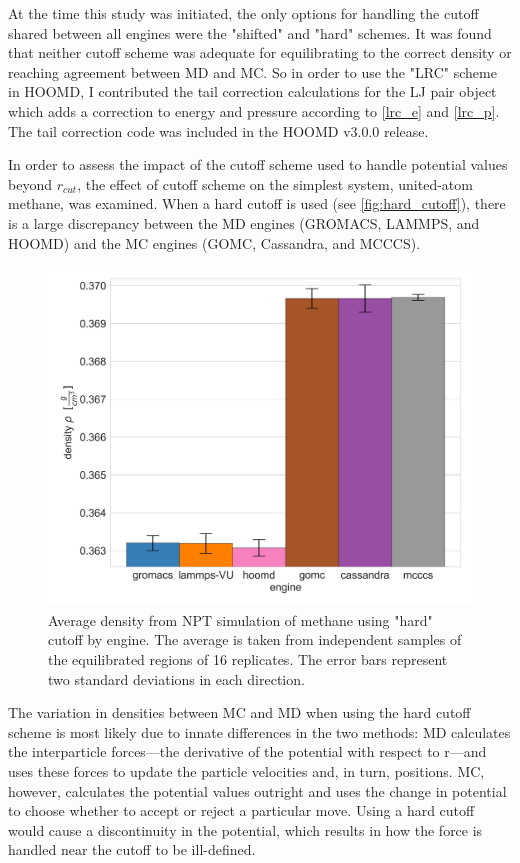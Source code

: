 At the time this study was initiated, the only options for handling the cutoff shared between all engines were the "shifted" and "hard" schemes.
It was found that neither cutoff scheme was adequate for equilibrating to the correct density or reaching agreement between MD and MC.
So in order to use the "LRC" scheme in HOOMD, I contributed the tail correction calculations for the LJ pair object which adds a correction to energy and pressure according to \autoref{lrc_e} and \autoref{lrc_p}.
The tail correction code was included in the HOOMD v3.0.0 release.

In order to assess the impact of the cutoff scheme used to handle potential values beyond $r_{cut}$, the effect of cutoff scheme on the simplest system, united-atom methane, was examined. 
When a hard cutoff is used (see \autoref{fig:hard_cutoff}), there is a large discrepancy between the MD engines (GROMACS, LAMMPS, and HOOMD) and the MC engines (GOMC, Cassandra, and MCCCS). 
\begin{figure}[h!]
    \centering
    \includegraphics[width=0.6\linewidth,keepaspectratio]{figures/rep_study/hard_cutoff.png}
    \caption{Average density from NPT simulation of methane using "hard" cutoff by engine. The average is taken from independent samples of the equilibrated regions of 16 replicates. The error bars represent two standard deviations in each direction.}\label{fig:hard_cutoff}
\end{figure}
The variation in densities between MC and MD when using the hard cutoff scheme is most likely due to innate differences in the two methods: MD calculates the interparticle forces---the derivative of the potential with respect to r---and uses these forces to update the particle velocities and, in turn, positions. MC, however, calculates the potential values outright and uses the change in potential to choose whether to accept or reject a particular move.
Using a hard cutoff would cause a discontinuity in the potential, which results in how the force is handled near the cutoff to be ill-defined.

